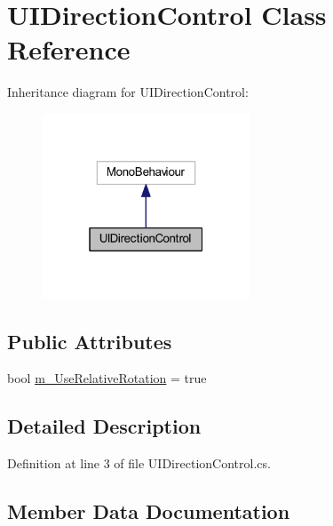 \hypertarget{class_u_i_direction_control}{}\section{U\+I\+Direction\+Control Class Reference}
\label{class_u_i_direction_control}


Inheritance diagram for U\+I\+Direction\+Control\+:
\nopagebreak
\begin{figure}[H]
\begin{center}
\leavevmode
\includegraphics[width=175pt]{class_u_i_direction_control__inherit__graph}
\end{center}
\end{figure}
\subsection*{Public Attributes}
\begin{DoxyCompactItemize}
\item 
bool \hyperlink{class_u_i_direction_control_a219ec5565829d998edb99068ce19c49c}{m\+\_\+\+Use\+Relative\+Rotation} = true
\end{DoxyCompactItemize}


\subsection{Detailed Description}


Definition at line 3 of file U\+I\+Direction\+Control.\+cs.



\subsection{Member Data Documentation}
\mbox{\label{class_u_i_direction_control_a219ec5565829d998edb99068ce19c49c}} 
